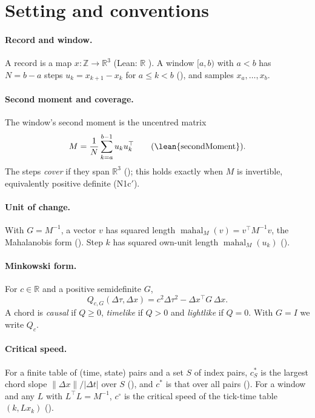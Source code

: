 \documentclass[11pt]{article}
\newcommand{\R}{\mathbb{R}}
\newcommand{\Z}{\mathbb{Z}}
\newcommand{\mahal}{\operatorname{mahal}}
\theoremstyle{definition}
\theoremstyle{plain}
\theoremstyle{remark}
\begin{document}
\section{Setting and conventions}\label{sec:setting}

\paragraph{Record and window.} A record is a map $x : \Z \to \R^3$ (Lean:  $\R$ ). A window $[a,b)$ with $a<b$ has $N=b-a$ steps $u_k = x_{k+1}-x_k$ for $a \le k < b$ (), and samples $x_a,\dots,x_b$.

\paragraph{Second moment and coverage.} The window's second moment is the uncentred matrix
\[ M = \frac1N \sum_{k=a}^{b-1} u_k u_k^{\top} \qquad \text{(\lean{secondMoment})}. \]
The steps \emph{cover} if they span $\R^3$ (); this holds exactly when $M$ is invertible, equivalently positive definite (N1c$'$).

\paragraph{Unit of change.} With $G = M^{-1}$, a vector $v$ has squared length $\mahal_M(v) = v^{\top} M^{-1} v$, the Mahalanobis form \cite{mahalanobis1936} (). Step $k$ has squared own-unit length $\mahal_M(u_k)$ ().

\paragraph{Minkowski form.} For $c\in\R$ and a positive semidefinite $G$,
\[ Q_{c,G}(\Delta\tau,\Delta x) = c^2 \Delta\tau^2 - \Delta x^{\top} G\, \Delta x. \]
A chord is \emph{causal} if $Q\ge0$, \emph{timelike} if $Q>0$ and \emph{lightlike} if $Q=0$. With $G=I$ we write $Q_c$.

\paragraph{Critical speed.} For a finite table of (time, state) pairs and a set $S$ of index pairs, $c^*_S$ is the largest chord slope $\|\Delta x\|/|\Delta t|$ over $S$ (), and $c^*$ is that over all pairs (). For a window and any $L$ with $L^{\top}L = M^{-1}$, $c^\circ$ is the critical speed of the tick-time table $(k, Lx_k)$ ().
\end{document}
